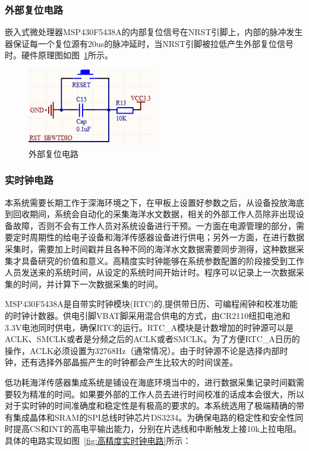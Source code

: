 \subsubsection{外部复位电路}
嵌入式微处理器MSP430F5438A的内部复位信号在NRST引脚上，内部的脉冲发生器保证每一个复位源有20us的脉冲延时，当NRST引脚被拉低产生外部复位信号时。硬件原理图如图~\ref{fig:外部复位电路}所示。
\begin{figure}[ht]
    \centering
	\includegraphics[width=0.5\textwidth]{fig/外部复位电路.png}
	\caption{外部复位电路}
	\label{fig:外部复位电路}
\end{figure}

\subsubsection{实时钟电路}
本系统需要长期工作于深海环境之下，在甲板上设置好参数之后，从设备投放海底到回收期间，系统会自动化的采集海洋水文数据，相关的外部工作人员除非出现设备故障，否则不会有工作人员对系统设备进行干预。一方面在电源管理的部分，需要定时周期性的给电子设备和海洋传感器设备进行供电；另外一方面，在进行数据采集时，需要加上时间戳并且各种不同的海洋水文数据需要同步测得，这种数据采集才具备研究的价值和意义。高精度实时钟能够在系统参数配置的阶段接受到工作人员发送来的系统时间，从设定的系统时间开始计时。程序可以记录上一次数据采集的时间，并计算下一次数据采集的时间。

MSP430F5438A是自带实时钟模块(RTC)的,提供带日历、可编程闹钟和校准功能的时钟计数器。供电引脚VBAT脚采用混合供电的方式，由CR2110纽扣电池和3.3V电池同时供电，确保RTC的运行。RTC\_A模块是计数增加的时钟源可以是ACLK、SMCLK或者是分频之后的ACLK或者SMCLK。为了方便RTC\_A日历的操作，ACLK必须设置为32768Hz（通常情况）。由于时钟源不论是选择内部时钟，还有选择外部晶振产生的时钟都会产生比较大的时间误差。

低功耗海洋传感器集成系统是铺设在海底环境当中的，进行数据采集记录时间戳需要较为精准的时间。如果要外部的工作人员去进行时间校准的话成本会很大，所以对于实时钟的时间准确度和稳定性是有极高的要求的。本系统选用了极端精确的带有集成晶体和SRAM的SPI总线时钟芯片DS3234。为确保电路的稳定性和安全性同时提高CS和INT的高电平输出能力，分别在片选线和中断触发上接10k上拉电阻。具体的电路实现如图~\ref{fig:高精度实时钟电路}所示：

